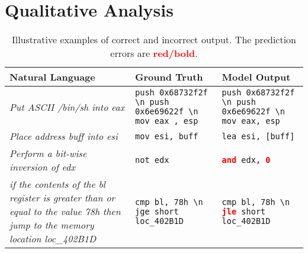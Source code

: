 \documentclass[11pt,a4paper]{article}
\begin{document}
 \begin{comment}

\begin{table*}[ht!]
\small
\centering
\begin{tabular}
{>{\centering\arraybackslash}m{1.5cm} | 
>{\centering\arraybackslash}m{1.5cm}
>{\centering\arraybackslash}m{1.5cm}  
>{\centering\arraybackslash}m{1.5cm}
>{\centering\arraybackslash}m{1.5cm}
>{\centering\arraybackslash}m{1.5cm}}

\toprule
\textbf{Model} & 
\textbf{BLEU-1 (\%)} & \textbf{BLEU-2 (\%)} & \textbf{BLEU-3 (\%)} & \textbf{BLEU-4 (\%)} & \textbf{ACC (\%)}  \\
\midrule
\textit{Best hyperparameter model} &  &  & &  & \\
\midrule
\textit{TL with CoNaLa} &  &  &  &  &  \\
\midrule
\textit{TL with Django} & & & & & \\
\bottomrule
\end{tabular}
\caption{Performance across metrics after transfer learning (TL) using CoNaLa and Django datasets}
\label{tab:tl}
\end{table*}
\end{comment}


 

\section{Qualitative Analysis}
\label{sec:qualitative}

\begin{table*}[ht!]
\footnotesize
\centering
\begin{tabular}{
 >{\centering\arraybackslash}m{6.5cm}|
 >{\centering\arraybackslash}m{4cm}|
 >{\centering\arraybackslash}m{4cm}}

\toprule
\textbf{Natural Language} & \textbf{Ground Truth} & \textbf{Model Output}\\
\midrule
\textit{Put ASCII /bin/sh into eax} & \texttt{push 0x68732f2f \textbackslash n push 0x6e69622f \textbackslash n mov eax , esp} & \texttt{push 0x68732f2f \textbackslash n push 0x6e69622f \textbackslash n mov eax, esp} \\
\midrule
\textit{Place address buff into esi} & \texttt{mov esi, buff} & \texttt{lea esi, [buff]}\\
\midrule
\textit{Perform a bit-wise inversion of edx} &    \texttt{not edx} & \texttt{\textcolor{red}{\textbf{and}} edx\textcolor{red}{\textbf{, 0}}}\\
\midrule
\textit{if the contents of the bl register is greater than or equal to the value 78h then jump to the memory location loc\_402B1D} &	\texttt{cmp bl, 78h  \textbackslash n jge short loc\_402B1D} & \texttt{cmp bl, 78h  \textbackslash n \textcolor{red}{\textbf{jle}} short loc\_402B1D} \\
\bottomrule
\end{tabular}
\caption{Illustrative examples of correct and incorrect output. The prediction errors are \textcolor{red}{\textbf{red/bold}}.}
\label{tab:cases}
\end{table*}
\end{document}

